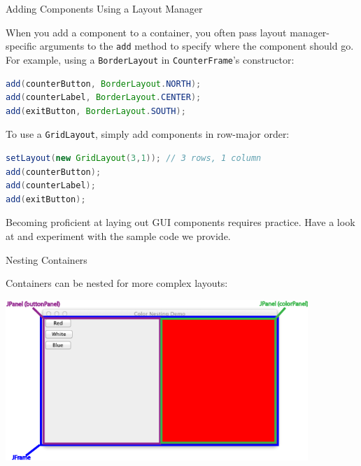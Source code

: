 \documentclass{beamer}
\begin{document}
\begin{frame}[fragile]{Adding Components Using a Layout Manager}


When you add a component to a container, you often pass layout manager-specific arguments to the {\tt add} method to specify where the component should go.  For example, using a {\tt BorderLayout} in {\tt CounterFrame}'s constructor:
\begin{lstlisting}[language=Java]
add(counterButton, BorderLayout.NORTH);
add(counterLabel, BorderLayout.CENTER);
add(exitButton, BorderLayout.SOUTH);
\end{lstlisting}
To use a {\tt GridLayout}, simply add components in row-major order:
\begin{lstlisting}[language=Java]
setLayout(new GridLayout(3,1)); // 3 rows, 1 column
add(counterButton);
add(counterLabel);
add(exitButton);
\end{lstlisting}

Becoming proficient at laying out GUI components requires practice.  Have a look at  and experiment with the sample code we provide.

\end{frame}

\begin{frame}[fragile]{Nesting Containers}


Containers can be nested for more complex layouts:
\begin{center}
\includegraphics[width=4.5in]{nesting-containers.png}
\end{center}


\end{frame}
\end{document}
